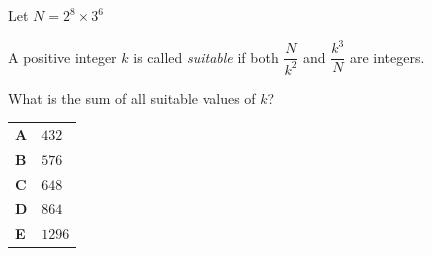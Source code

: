 \documentclass[11pt,a4paper]{article}
\begin{document}
\clearpage
\thispagestyle{djspaper}
\vspace*{8pt}
\begin{enumerate}[label=\textbf{\arabic*.},leftmargin=*,itemsep=0pt,start=11]
\questionitem[Number]
Let $N=2^8\times3^6$ 

A positive integer $k$ is called \textit{suitable} if both $\dfrac{N}{k^2}$ and $\dfrac{k^3}{N}$ are integers. 

What is the sum of all suitable values of $k$?

\par\vspace*{12pt}
\begin{tabularx}{\linewidth}{@{}>{\bfseries}l Y@{}}
A &
$432$
\\[0.8em]
B &
$576$
\\[0.8em]
C &
$648$
\\[0.8em]
D &
$864$
\\[0.8em]
E &
$1296$
\\
\end{tabularx}
\end{enumerate}
\clearpage
\thispagestyle{djspaper}
\vspace*{8pt}
\end{document}
